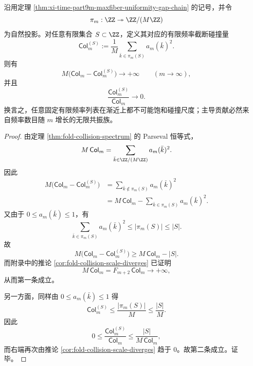 \begin{theorem}[固定有限频率证书对碰撞尺度的渐近失效]\label{thm:xi-time-part9m-fixed-frequency-collision-certificate-fails}
沿用定理 \ref{thm:xi-time-part9m-maxfiber-uniformity-gap-chain} 的记号，并令
\[
\pi_m:\ZZ\twoheadrightarrow \ZZ/(M\ZZ)
\]
为自然投影。对任意有限集合 \(S\subset\ZZ\)，定义其对应的有限频率截断碰撞量
\[
\mathsf{Col}_m^{(S)}
:=
\frac{1}{M}\sum_{\bar k\in \pi_m(S)}a_m(\bar k)^2.
\]
则有
\[
M\bigl(\mathsf{Col}_m-\mathsf{Col}_m^{(S)}\bigr)\longrightarrow +\infty
\qquad (m\to\infty),
\]
并且
\[
\frac{\mathsf{Col}_m^{(S)}}{\mathsf{Col}_m}\longrightarrow 0.
\]
换言之，任意固定有限频率列表在渐近上都不可能饱和碰撞尺度；主导贡献必然来自频率数目随 \(m\) 增长的无限共振族。
\end{theorem}
\begin{proof}
由定理 \ref{thm:fold-collision-spectrum} 的 Parseval 恒等式，
\[
M\,\mathsf{Col}_m=\sum_{\bar k\in \ZZ/(M\ZZ)}a_m(\bar k)^2.
\]
因此
\[
\begin{aligned}
M\bigl(\mathsf{Col}_m-\mathsf{Col}_m^{(S)}\bigr)
&=
\sum_{\bar k\notin \pi_m(S)}a_m(\bar k)^2\\
&=
M\,\mathsf{Col}_m-\sum_{\bar k\in \pi_m(S)}a_m(\bar k)^2.
\end{aligned}
\]
又由于 \(0\le a_m(\bar k)\le 1\)，有
\[
\sum_{\bar k\in \pi_m(S)}a_m(\bar k)^2\le |\pi_m(S)|\le |S|.
\]
故
\[
M\bigl(\mathsf{Col}_m-\mathsf{Col}_m^{(S)}\bigr)\ge M\,\mathsf{Col}_m-|S|.
\]
而附录中的推论 \ref{cor:fold-collision-scale-diverges} 已证明
\[
M\,\mathsf{Col}_m=F_{m+2}\,\mathsf{Col}_m\longrightarrow +\infty,
\]
从而第一条成立。

另一方面，同样由 \(0\le a_m(\bar k)\le 1\) 得
\[
\mathsf{Col}_m^{(S)}
\le
\frac{|\pi_m(S)|}{M}
\le
\frac{|S|}{M}.
\]
因此
\[
0\le
\frac{\mathsf{Col}_m^{(S)}}{\mathsf{Col}_m}
\le
\frac{|S|}{M\,\mathsf{Col}_m},
\]
而右端再次由推论 \ref{cor:fold-collision-scale-diverges} 趋于 \(0\)。故第二条成立。证毕。
\end{proof}
